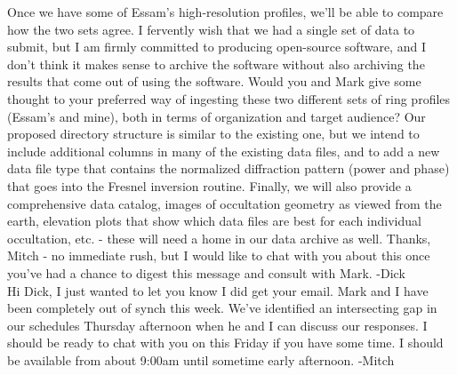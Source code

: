 \documentclass[crop=false,class=article,oneside]{standalone}
\begin{document}
Once we have some of Essam's high-resolution profiles, we'll be able to compare how the two sets agree. I fervently wish that we had a single set of data to submit, but I am firmly committed to producing open-source software, and I don't think it makes sense to archive the software without also archiving the results that come out of using the software. Would you and Mark give some thought to your preferred way of ingesting these two different sets of ring profiles (Essam's and mine), both in terms of organization and target audience? Our proposed directory structure is similar to the existing one, but we intend to include additional columns in many of the existing data files, and to add a new data file type that contains the normalized diffraction pattern (power and phase) that goes into the Fresnel inversion routine. Finally, we will also provide a comprehensive data catalog, images of occultation geometry as viewed from the earth, elevation plots that show which data files are best for each individual occultation, etc. - these will need a home in our data archive as well. Thanks, Mitch - no immediate rush, but I would like to chat with you about this once you've had a chance to digest this message and consult with Mark. -Dick\\
Hi Dick, I just wanted to let you know I did get your email. Mark and I have been completely out of synch this week. We’ve identified an intersecting gap in our schedules Thursday afternoon when he and I can discuss our responses. I should be ready to chat with you on this Friday if you have some time. I should be available from about 9:00am until sometime early afternoon. -Mitch
\end{document}
